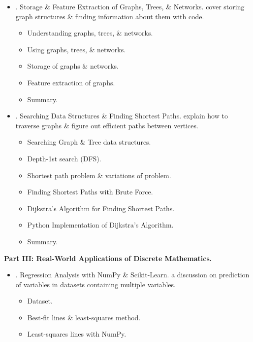 \documentclass{article}
\begin{document}
\begin{enumerate}
\begin{itemize}
\begin{itemize}
			\item {\sf Complexity of common search algorithms.}
			\item {\sf Common classes of computational complexity.}
			\item {\sf Summary.}
		\end{itemize}
		\item {. Storage \& Feature Extraction of Graphs, Trees, \& Networks.} cover storing graph structures \& finding information about them with code.
		\begin{itemize}
			\item {\sf Understanding graphs, trees, \& networks.}
			\item {\sf Using graphs, trees, \& networks.}
			\item {\sf Storage of graphs \& networks.}
			\item {\sf Feature extraction of graphs.}
			\item {\sf Summary.}
		\end{itemize}
		\item {. Searching Data Structures \& Finding Shortest Paths.} explain how to traverse graphs \& figure out efficient paths between vertices.
		\begin{itemize}
			\item {\sf Searching Graph \& Tree data structures.}
			\item {\sf Depth-1st search (DFS).}
			\item {\sf Shortest path problem \& variations of problem.}
			\item {\sf Finding Shortest Paths with Brute Force.}
			\item {\sf Dijkstra's Algorithm for Finding Shortest Paths.}
			\item {\sf Python Implementation of Dijkstra's Algorithm.}
			\item {\sf Summary.}
		\end{itemize}
	\end{itemize}
	{\bf Part III: Real-World Applications of Discrete Mathematics.}
	\begin{itemize}
		\item {. Regression Analysis with NumPy \& Scikit-Learn.} a discussion on prediction of variables in datasets containing multiple variables.
		\begin{itemize}
			\item {\sf Dataset.}
			\item {\sf Best-fit lines \& least-squares method.}
			\item {\sf Least-squares lines with NumPy.}

\end{itemize}
\end{itemize}
\end{enumerate}
\end{document}
